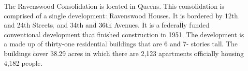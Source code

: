 The Ravenswood Consolidation is located in Queens. This consolidation is comprised of a single development: Ravenswood Houses. It is bordered by 12th and 24th Streets, and 34th and 36th Avenues. It is a federally funded conventional development that finished construction in 1951. The development is a made up of thirty-one residential buildings that are 6 and 7- stories tall. The buildings cover 38.29 acres in which there are 2,123 apartments officially housing 4,182 people.